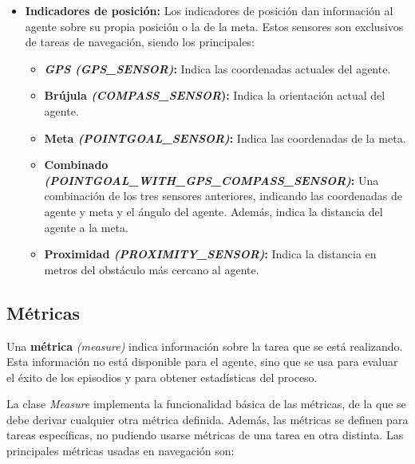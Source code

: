 \begin{itemize}
	\item \textbf{Indicadores de posición:} Los indicadores de posición dan información al agente sobre su propia posición o la de la meta. Estos sensores son exclusivos de tareas de navegación, siendo los principales:
	\begin{itemize}
	\item \textbf{\textit{GPS (GPS{\_}SENSOR)}:} Indica las coordenadas actuales del agente.
	\item \textbf{Brújula \textit{(COMPASS{\_}SENSOR}):} Indica la orientación actual del agente.
	\item \textbf{Meta \textit{(POINTGOAL{\_}SENSOR)}:} Indica las coordenadas de la meta.
	\item \textbf{Combinado \textit{(POINTGOAL{\_}WITH{\_}GPS{\_}COMPASS{\_}SENSOR)}:} Una combinación de los tres sensores anteriores, indicando las coordenadas de agente y meta y el ángulo del agente. Además, indica la distancia del agente a la meta.
	\item \textbf{Proximidad \textit{(PROXIMITY{\_}SENSOR)}:} Indica la distancia en metros del obstáculo más cercano al agente.
	\end{itemize}
\end{itemize}

\subsection{Métricas}

Una \textbf{métrica} \textit{(measure)} indica información sobre la tarea que se está realizando. Esta información no está disponible para el agente, sino que se usa para evaluar el éxito de los episodios y para obtener estadísticas del proceso.

La clase \textit{Measure} implementa la funcionalidad básica de las métricas, de la que se debe derivar cualquier otra métrica definida. Además, las métricas se definen para tareas específicas, no pudiendo usarse métricas de una tarea en otra distinta. Las principales métricas usadas en navegación son:

